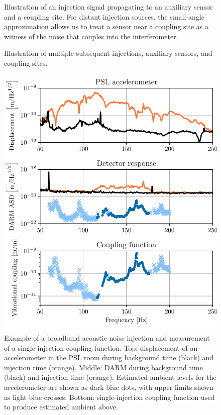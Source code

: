 \documentclass[11pt]{article}
\begin{document}
\begin{figure}
	\caption{
		Illustration of an injection signal propagating to an auxiliary sensor and a coupling site.
		For distant injection sources, the small-angle approximation allows us to treat a sensor near a coupling site as a witness of the noise that couples into the interferometer.}
	\label{fig:injection_cartoon}
\end{figure}

\begin{figure}
	\caption{
		Illustration of multiple subsequent injections, auxiliary sensors, and coupling sites.}
	\label{fig:injection_cartoon_extended}
\end{figure}

\begin{figure}
	\centering
	\includegraphics[width=\textwidth]{figures/cf-example.pdf}
	\caption{
		Example of a broadband acoustic noise injection and measurement of a single-injection coupling function.
		Top: displacement of an accelerometer in the PSL room during background time (black) and injection time (orange).
		Middle: DARM during background time (black) and injection time (orange).
		Estimated ambient levels for the accelerometer are shown as dark blue dots, with upper limits shown as light blue crosses.
		Bottom: single-injection coupling function used to produce estimated ambient above.}
	\label{fig:cf_example}
\end{figure}
\end{document}
